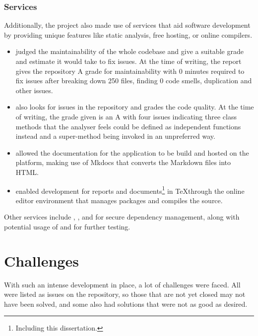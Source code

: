 \documentclass[../main.tex]{subfiles}
\begin{document}
\subsubsection{Services}

Additionally, the project also made use of services that aid software development by providing unique features like static analysis, free hosting, or online compilers.

\begin{itemize}
    \item \textbf{} judged the maintainability of the whole codebase and give a suitable grade and estimate it would take to fix issues. At the time of writing, the report gives the repository A grade for maintainability with 0 minutes required to fix issues after breaking down 250 files, finding 0 code smells, duplication and other issues.
    \item \textbf{} also looks for issues in the repository and grades the code quality. At the time of writing, the grade given is an A with four issues indicating three class methods that the analyser feels could be defined as independent functions instead and a super-method being invoked in an unpreferred way.
    \item \textbf{} allowed the documentation for the application to be build and hosted on the platform, making use of Mkdocs that converts the Markdown files into HTML.
    \item \textbf{} enabled development for reports and documents\footnote{Including this dissertation.} in \TeX through the online editor environment that manages packages and compiles the source.
\end{itemize}

Other services include , , and  for secure dependency management, along with potential usage of  and  for further testing.

\section{Challenges}

With such an intense development in place, a lot of challenges were faced. All were listed as issues on the repository, so those that are not yet closed may not have been solved, and some also had solutions that were not as good as desired.
\end{document}
